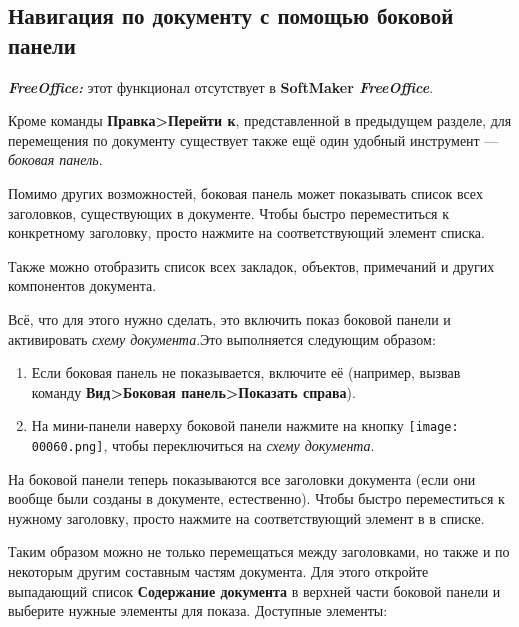 \documentclass[a4paper,10pt]{article}
\begin{document}
\subsection{Навигация по документу с помощью боковой панели}

\begin{mdframed}[backgroundcolor=pink!50]
\textbf{\textit{FreeOffice:}} этот функционал отсутствует в \textbf{SoftMaker \textit{FreeOffice}}.
\end{mdframed}

Кроме команды \textbf{Правка>Перейти к}, представленной в предыдущем разделе, для перемещения по документу существует также ещё один удобный инструмент --- \textit{боковая панель}.

Помимо других возможностей, боковая панель может показывать список всех заголовков, существующих в документе. Чтобы быстро переместиться к конкретному заголовку, просто нажмите на соответствующий элемент списка.

Также можно отобразить список всех закладок, объектов, примечаний и других компонентов документа.

Всё, что для этого нужно сделать, это включить показ боковой панели и активировать \textit{схему документа}.Это выполняется следующим образом:

\begin{enumerate}
 \item Если боковая панель не показывается, включите её (например, вызвав команду \textbf{Вид>Боковая панель>Показать справа}).
 \item На мини-панели наверху боковой панели нажмите на кнопку \texttt{[image: 00060.png]}, чтобы переключиться на \textit{схему документа}.
\end{enumerate}

На боковой панели теперь показываются все заголовки документа (если они вообще были созданы в документе, естественно). Чтобы быстро переместиться к нужному заголовку, просто нажмите на соответствующий элемент в в списке.

Таким образом можно не только перемещаться между заголовками, но также и по некоторым другим составным частям документа. Для этого откройте выпадающий список \textbf{Содержание документа} в верхней части боковой панели и выберите нужные элементы для показа. Доступные элементы:
\end{document}
